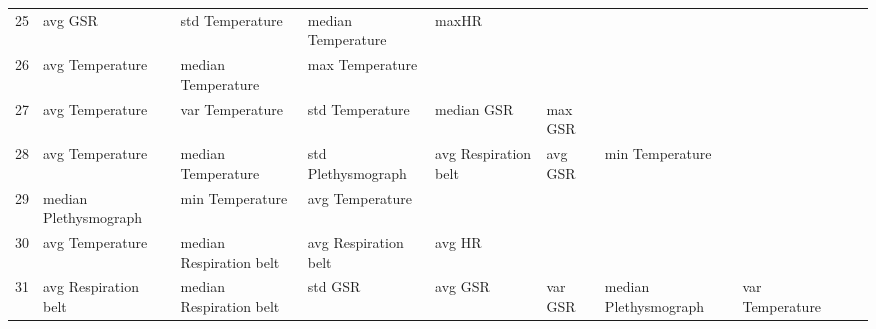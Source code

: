 \begin{landscape}
\begin{table}[]
\begin{tabular}{l|llllllll}
25       & avg GSR                 & std Temperature         & median Temperature      & maxHR                   &                         &                       &                         &                         &                         &         \\
26       & avg Temperature         & median Temperature      & max Temperature         &                         &                         &                       &                         &                         &                         &         \\
27       & avg Temperature         & var Temperature         & std Temperature         & median GSR              & max GSR                 &                       &                         &                         &                         &         \\
28       & avg Temperature         & median Temperature      & std Plethysmograph      & avg Respiration belt    & avg GSR                 & min Temperature       &                         &                         &                         &         \\
29       & median Plethysmograph   & min Temperature         & avg Temperature         &                         &                         &                       &                         &                         &                         &         \\
30       & avg Temperature         & median Respiration belt & avg Respiration belt    & avg HR                  &                         &                       &                         &                         &                         &         \\
31       & avg Respiration belt    & median Respiration belt & std GSR                 & avg GSR                 & var GSR                 & median Plethysmograph & var Temperature         &                         &                         &         \\    
\end{tabular}
\end{table}
\end{landscape}
